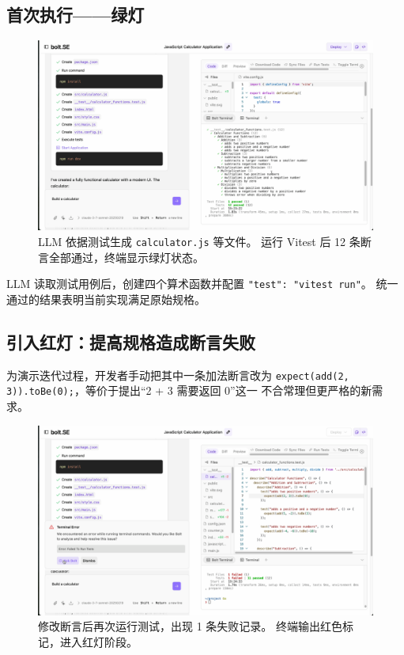 \subsection{首次执行——绿灯}

\begin{figure}[htbp]
  \centering
  \includegraphics[width=.9\textwidth]{figures/screenshots/tdd/green_pass_initial.png}
  \caption{LLM 依据测试生成 \texttt{calculator.js} 等文件。
           运行 Vitest 后 12 条断言全部通过，终端显示绿灯状态。}
  \label{fig:tdd_green_initial}
\end{figure}

LLM 读取测试用例后，创建四个算术函数并配置
\verb|"test": "vitest run"|。  
统一通过的结果表明当前实现满足原始规格。

\subsection{引入红灯：提高规格造成断言失败}

为演示迭代过程，开发者手动把其中一条加法断言改为
\verb|expect(add(2, 3)).toBe(0);|，等价于提出“2 + 3 需要返回 0”这一
不合常理但更严格的新需求。

\begin{figure}[htbp]
  \centering
  \includegraphics[width=.9\textwidth]{figures/screenshots/tdd/test_edit_fail.png}
  \caption{修改断言后再次运行测试，出现 1 条失败记录。  
           终端输出红色标记，进入红灯阶段。}
  \label{fig:tdd_red}
\end{figure}

